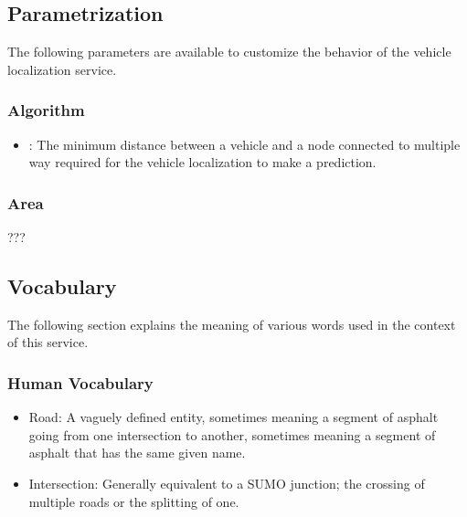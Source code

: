 \documentclass[letterpaper,10pt,english]{sphinxmanual}
\begin{document}
\subsection{Parametrization}
\label{\detokenize{microservices/vehicle_localization/parametrization:parametrization}}\label{\detokenize{microservices/vehicle_localization/parametrization::doc}}
The following parameters are available to customize the behavior of the vehicle localization service.


\subsubsection{Algorithm}
\label{\detokenize{microservices/vehicle_localization/parametrization:algorithm}}\begin{itemize}
\item {} 
:
The minimum distance between a vehicle and a node connected to multiple way required for the vehicle localization to make a prediction.

\end{itemize}


\subsubsection{Area}
\label{\detokenize{microservices/vehicle_localization/parametrization:area}}
???


\subsection{Vocabulary}
\label{\detokenize{microservices/vehicle_localization/vocabulary:vocabulary}}\label{\detokenize{microservices/vehicle_localization/vocabulary::doc}}
The following section explains the meaning of various words used in the context of this service.


\subsubsection{Human Vocabulary}
\label{\detokenize{microservices/vehicle_localization/vocabulary:human-vocabulary}}\begin{itemize}
\item {} 
Road: A vaguely defined entity, sometimes meaning a segment of asphalt going from one intersection to another, sometimes meaning a segment of asphalt that has the same given name.

\item {} 
Intersection: Generally equivalent to a SUMO junction; the crossing of multiple roads or the splitting of one.

\end{itemize}
\end{document}
